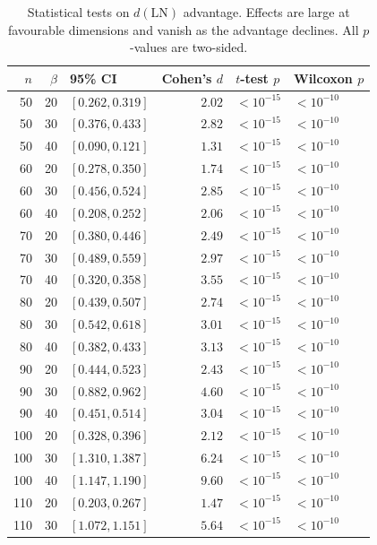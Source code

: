 \documentclass[journal=cic,version=preprint]{iacrj}
\begin{document}
\begin{table}[tbp]
\centering
\caption{Statistical tests on $d(\mathrm{LN})$ advantage. Effects are large at favourable dimensions and vanish as the advantage declines. All $p$-values are two-sided.\label{tab:stats}}
\small
\begin{tabular}{rrlrll}
\hline
$n$ & $\beta$ & 95\% CI & Cohen's $d$ & $t$-test $p$ & Wilcoxon $p$ \\
\hline
50  & 20 & $[0.262, 0.319]$ & $2.02$  & $<10^{-15}$ & $<10^{-10}$ \\
50  & 30 & $[0.376, 0.433]$ & $2.82$  & $<10^{-15}$ & $<10^{-10}$ \\
50  & 40 & $[0.090, 0.121]$ & $1.31$  & $<10^{-15}$ & $<10^{-10}$ \\
60  & 20 & $[0.278, 0.350]$ & $1.74$  & $<10^{-15}$ & $<10^{-10}$ \\
60  & 30 & $[0.456, 0.524]$ & $2.85$  & $<10^{-15}$ & $<10^{-10}$ \\
60  & 40 & $[0.208, 0.252]$ & $2.06$  & $<10^{-15}$ & $<10^{-10}$ \\
70  & 20 & $[0.380, 0.446]$ & $2.49$  & $<10^{-15}$ & $<10^{-10}$ \\
70  & 30 & $[0.489, 0.559]$ & $2.97$  & $<10^{-15}$ & $<10^{-10}$ \\
70  & 40 & $[0.320, 0.358]$ & $3.55$  & $<10^{-15}$ & $<10^{-10}$ \\
80  & 20 & $[0.439, 0.507]$ & $2.74$  & $<10^{-15}$ & $<10^{-10}$ \\
80  & 30 & $[0.542, 0.618]$ & $3.01$  & $<10^{-15}$ & $<10^{-10}$ \\
80  & 40 & $[0.382, 0.433]$ & $3.13$  & $<10^{-15}$ & $<10^{-10}$ \\
90  & 20 & $[0.444, 0.523]$ & $2.43$  & $<10^{-15}$ & $<10^{-10}$ \\
90  & 30 & $[0.882, 0.962]$ & $4.60$  & $<10^{-15}$ & $<10^{-10}$ \\
90  & 40 & $[0.451, 0.514]$ & $3.04$  & $<10^{-15}$ & $<10^{-10}$ \\
100 & 20 & $[0.328, 0.396]$ & $2.12$  & $<10^{-15}$ & $<10^{-10}$ \\
100 & 30 & $[1.310, 1.387]$ & $6.24$  & $<10^{-15}$ & $<10^{-10}$ \\
100 & 40 & $[1.147, 1.190]$ & $9.60$  & $<10^{-15}$ & $<10^{-10}$ \\
110 & 20 & $[0.203, 0.267]$ & $1.47$  & $<10^{-15}$ & $<10^{-10}$ \\
110 & 30 & $[1.072, 1.151]$ & $5.64$  & $<10^{-15}$ & $<10^{-10}$ \\

\end{tabular}
\end{table}
\end{document}
